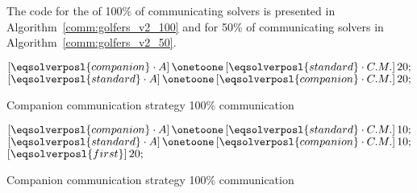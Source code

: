 The code for the \commstr{} of 100\% of communicating solvers is presented in Algorithm~\ref{comm:golfers_v2_100} and for 50\% of communicating solvers in Algorithm~\ref{comm:golfers_v2_50}. 

\begin{algorithm}[H]
\dontprintsemicolon
\SetNoline
$\left[\eqsolverposl{companion}\cdot A\right] \onetoone \left[\eqsolverposl{standard}\cdot C.M.\right]20;$\;
$\left[\eqsolverposl{standard}\cdot A\right] \onetoone \left[\eqsolverposl{companion}\cdot C.M.\right]20;$
\caption{Companion communication strategy 100\% communication}\label{comm:golfers_v2_100}
\end{algorithm}

\begin{algorithm}[H]
\dontprintsemicolon
\SetNoline
$\left[\eqsolverposl{companion}\cdot A\right] \onetoone \left[\eqsolverposl{standard}\cdot C.M.\right]10;$\;
$\left[\eqsolverposl{standard}\cdot A\right] \onetoone \left[\eqsolverposl{companion}\cdot C.M.\right]10;$\;
$\left[\eqsolverposl{first}\right]20;$\;
\caption{Companion communication strategy 100\% communication}\label{comm:golfers_v2_50}
\end{algorithm}

\begin{table}
\captionsetup{belowskip=6pt,aboveskip=6pt}
\centering 
\renewcommand{\arraystretch}{1}
\caption{Companion \commstr{} with communication \oneTn}
\label{tab:golfers_v2_1N}
\end{table}


